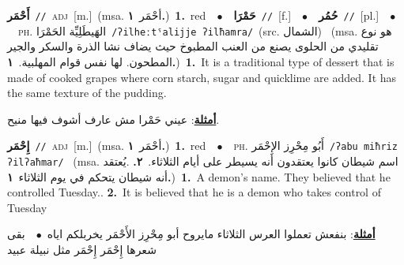 \documentclass[10pt,a4paper,twoside]{article} %
\begin{document}
\begin{multicols}{2}
{\setlength\topsep{0pt}\textbf{\foreignlanguage{arabic}{أَحْمَر}}\ {\color{gray}\texttt{//}\color{black}}\ \textsc{adj}\ [m.]\ \color{gray}(msa. \foreignlanguage{arabic}{أحْمَر}~\foreignlanguage{arabic}{\textbf{١.}})\color{black}\ \textbf{1.}~red\ \ $\bullet$\ \ \setlength\topsep{0pt}\textbf{\foreignlanguage{arabic}{حَمْرَا}}\ {\color{gray}\texttt{//}\color{black}}\ [f.]\ \ $\bullet$\ \ \setlength\topsep{0pt}\textbf{\foreignlanguage{arabic}{حُمُر}}\ {\color{gray}\texttt{//}\color{black}}\ [pl.]\ \ $\bullet$\ \ \textsc{ph.} \color{gray} \foreignlanguage{arabic}{الهَيطَلِيِّة الحَمْرَا}\color{black}\ {\color{gray}\texttt{/{\sffamily ʔilheːtˤalijje ʔilħamra}/}\color{black}}\ \color{gray}(src. \foreignlanguage{arabic}{الشمال})\color{black}\ \color{gray} (msa. \foreignlanguage{arabic}{هو نوع تقليدي من الحلوى يصنع من العنب المطبوخ حيث يضاف نشا الذرة والسكر والجير المطحون. لها نفس قوام المهلبية.}~\foreignlanguage{arabic}{\textbf{١.}})\color{black}\ \textbf{1.}~It is a traditional type of dessert that is made of cooked grapes where corn starch, sugar  and quicklime are added. It has the same texture of the pudding.\  \begin{flushright}\color{gray}\foreignlanguage{arabic}{\textbf{\underline{\foreignlanguage{arabic}{أمثلة}}}: عيني حَمْرا مش عارف أشوف فيها منيح.}\end{flushright}\color{black}} \vspace{2mm}

{\setlength\topsep{0pt}\textbf{\foreignlanguage{arabic}{إِحْمَر}}\ {\color{gray}\texttt{//}\color{black}}\ \textsc{adj}\ [m.]\ \color{gray}(msa. \foreignlanguage{arabic}{أحْمَر}~\foreignlanguage{arabic}{\textbf{١.}})\color{black}\ \textbf{1.}~red\ \ $\bullet$\ \ \textsc{ph.} \color{gray} \foreignlanguage{arabic}{أَبُو مِحْرِز الإِحْمَر}\color{black}\ {\color{gray}\texttt{/{\sffamily ʔabu miħriz ʔilʔaħmar}/}\color{black}}\ \color{gray} (msa. \foreignlanguage{arabic}{اسم شيطان كانوا يعتقدون أنه يسيطر على أيام الثلاثاء.}~\foreignlanguage{arabic}{\textbf{٢.}}  .\foreignlanguage{arabic}{يُعتقد أنه شيطان يتحكم في يوم الثلاثاء}~\foreignlanguage{arabic}{\textbf{١.}})\color{black}\ \textbf{1.}~A demon's name. They believed that he controlled Tuesday..  \textbf{2.}~It is believed that he is a demon who takes control of Tuesday\  \begin{flushright}\color{gray}\foreignlanguage{arabic}{\textbf{\underline{\foreignlanguage{arabic}{أمثلة}}}: بنفعش تعملوا العرس الثلاثاء مايروح أبو مِحْرِز الأَحْمَر يخربلكم اياه\ $\bullet$\ \  بقى شعرها إِحْمَر إِحْمَر مثل نبيلة عبيد}\end{flushright}\color{black}} \vspace{2mm}


\end{multicols}
\end{document}

